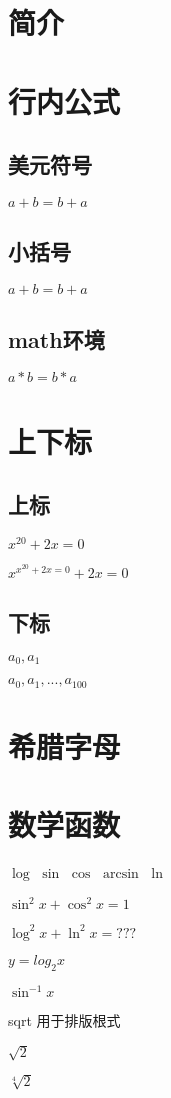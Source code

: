 \documentclass[UTF8]{article}
\date{\today}
\begin{document}
	\section{简介}
	\section{行内公式}
	\subsection{美元符号}
	$a+b = b+a$
	\subsection{小括号}
	\(a+b=b+a\)
	\subsection{math环境}
		\begin{math}
			a*b=b*a
		\end{math}
	\section{上下标}
	\subsection{上标}
	$x^{20}+2x=0$
	
	$x^{x^{20}+2x=0}+2x=0$
	\subsection{下标}
	$a_0, a_1$
	
	$a_0 , a_1, ... ,a_{100} $
	\section{希腊字母}
	\section{数学函数}
	$\log$
	$\sin$
	$\cos$
	$\arcsin$
	$\ln$
	
	$\sin^2 x+\cos^2 x =1$
	
	$\log^2 x+\ln^2 x =???$
	
	$y=log_2 x$
	
	$\sin^{-1}x$
	
	sqrt 用于排版根式
	
	$\sqrt{2}$
	
	$\sqrt[4]{2}$
	
\end{document}
